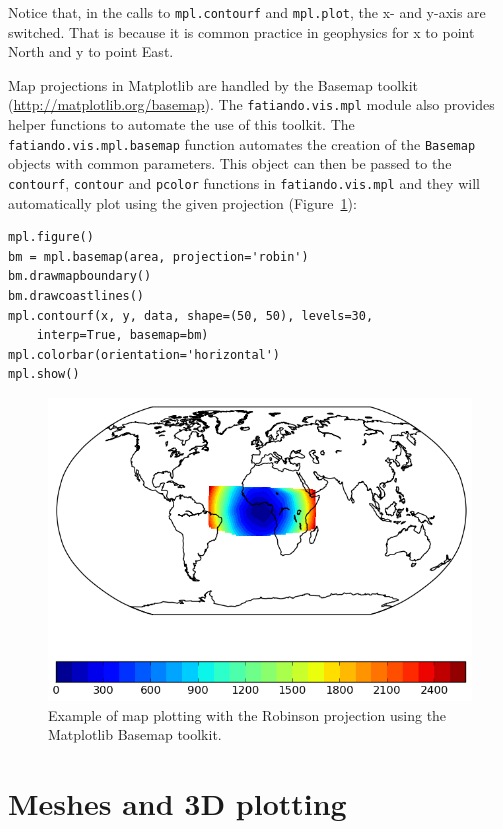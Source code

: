 Notice that, in the calls to \texttt{mpl.contourf} and
\texttt{mpl.plot}, the x- and y-axis are switched. That is because it is
common practice in geophysics for x to point North and y to point East.

Map projections in Matplotlib are handled by the
Basemap toolkit (\url{http://matplotlib.org/basemap}). The
\texttt{fatiando.vis.mpl} module also provides helper functions to
automate the use of this toolkit. The \texttt{fatiando.vis.mpl.basemap}
function automates the creation of the \texttt{Basemap} objects with
common parameters. This object can then be passed to the
\texttt{contourf}, \texttt{contour} and \texttt{pcolor} functions in
\texttt{fatiando.vis.mpl} and they will automatically plot using the
given projection (Figure~\ref{fig:p1-basemap}):

\begin{verbatim}
mpl.figure()
bm = mpl.basemap(area, projection='robin')
bm.drawmapboundary()
bm.drawcoastlines()
mpl.contourf(x, y, data, shape=(50, 50), levels=30,
    interp=True, basemap=bm)
mpl.colorbar(orientation='horizontal')
mpl.show()
\end{verbatim}

\begin{figure}
    \centering
    \includegraphics[width=\textwidth]{figures/paper-fatiando/gridding_plotting_basemap}
    \caption{
        Example of map plotting with the Robinson projection using the
        Matplotlib Basemap toolkit.
    }
    \label{fig:p1-basemap}
\end{figure}



\section{Meshes and 3D plotting}


